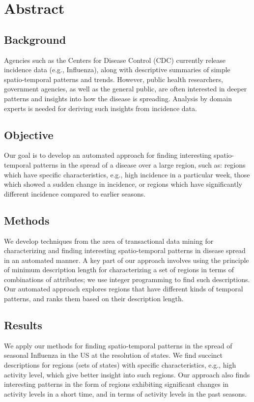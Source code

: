 \section*{Abstract}

\subsection*{Background}
Agencies such as the Centers for Disease Control (CDC) currently release incidence
data (e.g., Influenza), along with descriptive summaries of simple
spatio-temporal patterns and trends. However, public health researchers, government agencies,
as well as the general public, are often interested in deeper patterns and insights
into how the disease is spreading.
Analysis by domain experts is needed for deriving such insights from
incidence data.

\subsection*{Objective}
Our goal is to develop an automated approach for finding 
interesting spatio-temporal patterns in the spread of a disease
over a large region, such as:
regions which have specific characteristics, e.g., high incidence
in a particular week, those which showed a sudden change in incidence,
or regions which have significantly different incidence compared to
earlier seasons.

\subsection*{Methods}
We develop techniques from the area of transactional data mining for characterizing
and finding interesting spatio-temporal patterns in disease spread in an
automated manner.  A key part of our approach involves using the principle of
minimum description length for characterizing a set of regions in terms of
combinations of attributes; we use integer programming to find such descriptions.
Our automated approach explores regions that have different kinds of temporal
patterns, and ranks them based on their description length.

\subsection*{Results}
We apply our methods for finding spatio-temporal patterns in the spread of
seasonal Influenza in the US at the resolution of states. We find succinct
descriptions for regions (sets of states) with specific characteristics,
e.g., high activity level, which give better insight into such regions.
Our approach also finds interesting patterns in the form of
regions exhibiting significant changes in activity levels in a short time,
and in terms of activity levels in the past seasons.


